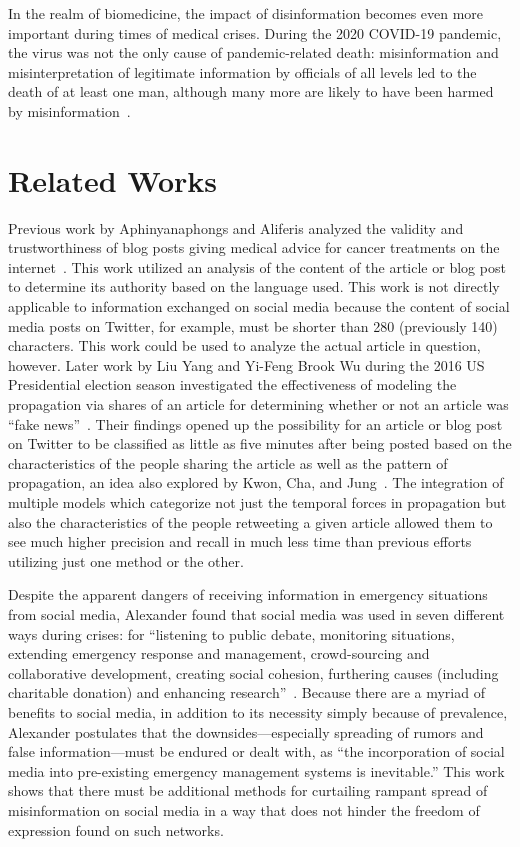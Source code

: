 \documentclass[conference]{IEEEtran}
\begin{document}
In the realm of biomedicine, the impact of disinformation becomes
even more important during times of medical crises. During the
2020 COVID-19 pandemic, the virus was not the only cause of
pandemic-related death: misinformation and misinterpretation of
legitimate information by officials of all levels led to the
death of at least one man, although many more are likely to have
been harmed by misinformation~\cite{fishtank}.

\section{Related Works}

Previous work by Aphinyanaphongs and Aliferis analyzed the
validity and trustworthiness of blog posts giving medical advice
for cancer treatments on the internet~\cite{textcat}. This work
utilized an analysis of the content of the article or blog post
to determine its authority based on the language used.  This work
is not directly applicable to information exchanged on social
media because the content of social media posts on Twitter, for
example, must be shorter than 280 (previously 140) characters.
This work could be used to analyze the actual article in
question, however. Later work by Liu Yang and Yi-Feng Brook Wu
during the 2016 US Presidential election season investigated the
effectiveness of modeling the propagation via shares of an
article for determining whether or not an article was ``fake
news''~\cite{fakenews}. Their findings opened up the possibility
for an article or blog post on Twitter to be classified as little
as five minutes after being posted based on the characteristics
of the people sharing the article as well as the pattern of
propagation, an idea also explored by Kwon, Cha, and
Jung~\cite{rumordetection}. The integration of multiple models
which categorize not just the temporal forces in propagation but
also the characteristics of the people retweeting a given article
allowed them to see much higher precision and recall in much less
time than previous efforts utilizing just one method or the
other.

Despite the apparent dangers of receiving information in
emergency situations from social media, Alexander found that
social media was used in seven different ways during crises: for
``listening to public debate, monitoring situations, extending
emergency response and management, crowd-sourcing and
collaborative development, creating social cohesion, furthering
causes (including charitable donation) and enhancing
research''~\cite{socialriskreduction}. Because there are a myriad
of benefits to social media, in addition to its necessity simply
because of prevalence, Alexander postulates that the
downsides---especially spreading of rumors and false
information---must be endured or dealt with, as ``the
incorporation of social media into pre-existing emergency
management systems is inevitable.'' This work shows that there
must be additional methods for curtailing rampant spread of
misinformation on social media in a way that does not hinder the
freedom of expression found on such networks.
\end{document}
